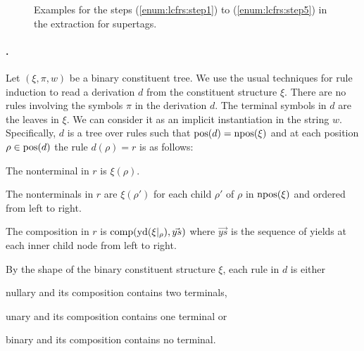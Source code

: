 \documentclass[../../document.tex]{subfiles}
\begin{document}
\begin{figure}
        \vspace{0cm}

        \null{\hfill}
        {\scriptsize}
        \hfill
        \begin{minipage}{.4\linewidth}
        \end{minipage}

        \vspace{.3cm}


        \caption{\label{fig:extraction:lcfrs}
            Examples for the steps (\ref{enum:lcfrs:step1}) to (\ref{enum:lcfrs:step5}) in the extraction for  supertags.
        }
    \end{figure}


    \paragraph{.}
    Let \((\xi, \pi, w)\) be a binary constituent tree.
    We use the usual techniques for  rule induction to read a derivation \(d\) from the constituent structure \(\xi\).
    There are no rules involving the  symbols \(\pi\) in the derivation \(d\).
    The terminal symbols in \(d\) are the leaves in \(\xi\). We can consider it as an implicit instantiation in the string \(w\).
    Specifically, \(d\) is a tree over  rules such that \(\operatorname{pos}(d) = \operatorname{npos}(\xi)\) and at each position \(\rho \in \operatorname{pos}(d)\) the rule \(d(\rho) = r\) is as follows:
    \begin{compactitem}
        \item The  nonterminal in \(r\) is \(\xi(\rho)\).
        \item The  nonterminals in \(r\) are \(\xi(\rho')\) for each child \(\rho'\) of \(\rho\) in \(\operatorname{npos}(\xi)\) and ordered from left to right.
        \item The composition in \(r\) is \(\mathrm{comp}(\operatorname{yd}(\xi|_\rho), \vec{ys})\) where \(\vec{ys}\) is the sequence of yields at each inner child node from left to right.
    \end{compactitem}
    By the shape of the binary constituent structure \(\xi\), each rule in \(d\) is either
    \begin{inparaitem}[]
        \item nullary and its composition contains two terminals,
        \item unary and its composition contains one terminal or
        \item binary and its composition contains no terminal.
    \end{inparaitem}
\end{document}
